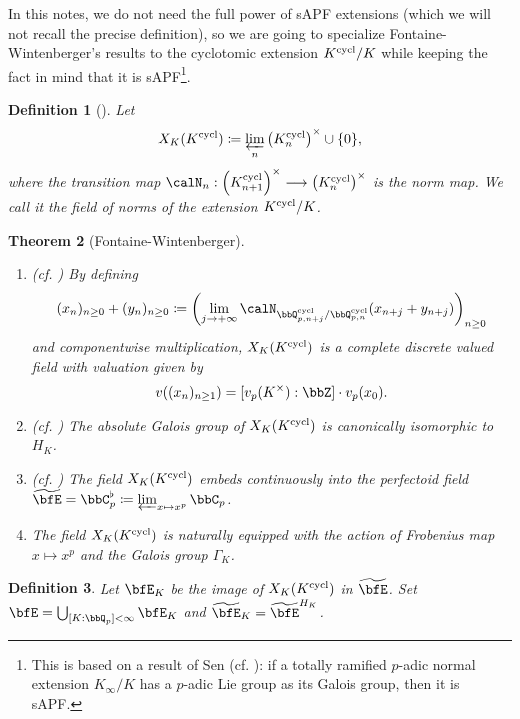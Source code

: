\documentclass[a4paper,oneside]{amsart}
\newtheorem{theorem}{Theorem}[section]
\newtheorem{definition}[theorem]{Definition}
\numberwithin{equation}{section}
\numberwithin{figure}{section}
\begin{document}
In this notes, we do not need the full power of sAPF extensions (which we will not recall the precise definition), so we are going to specialize Fontaine-Wintenberger's results to the cyclotomic extension $K^{\operatorname{cycl}}/K$ while keeping the fact in mind that it is sAPF\footnote{This is based on a result of Sen (cf. \cite{sen_ramification_1972}): if a totally ramified $p$-adic normal extension $K_\infty/K$ has a $p$-adic Lie group as its Galois group, then it is sAPF.}.
\begin{definition}[{\cite[Section 2.1.1]{wintenberger_corps_1983}}]
    Let $$X_K(K^{\operatorname{cycl}})\coloneqq\varprojlim_n \left(K_n^{\operatorname{cycl}}\right)^\times\cup\{0\},$$
    where the transition map $\calN_n:\left(K_{n+1}^{\opn{cycl}}\right)^\times\lto \left(K_n^{\opn{cycl}}\right)^\times$ is the norm map. We call it the field of norms of the extension $K^{\operatorname{cycl}}/K$.
\end{definition}
\begin{theorem}[Fontaine-Wintenberger]\leavevmode
    \begin{enumerate}
        \item (cf. \cite[Th\'eor\`eme 2.1.3]{wintenberger_corps_1983}) By defining 
        $$(x_n)_{n\geq 0}+(y_n)_{n\geq 0}\coloneqq \left(\lim_{j\to +\infty}\calN_{\bbQ_{p,n+j}^{\opn{cycl}}/\bbQ_{p,n}^{\opn{cycl}}}(x_{n+j}+y_{n+j})\right)_{n\geq 0}$$
        and componentwise multiplication, $X_K(K^{\operatorname{cycl}})$ is a complete discrete valued field with valuation given by
              $$v((x_n)_{n\geq 1})=[v_p(K^\times):\bbZ]\cdot v_p(x_0).$$
        \item (cf. \cite[Corollaire 3.2.3]{wintenberger_corps_1983}) The absolute Galois group of $X_K(K^{\operatorname{cycl}})$ is canonically isomorphic to $H_K$.
        \item (cf. \cite[Proposition 4.2.1]{wintenberger_corps_1983}) The field $X_K(K^{\operatorname{cycl}})$ embeds continuously into the perfectoid field $\widetilde{\bfE}=\bbC_p^\flat\coloneqq \varprojlim_{x\mapsto x^p}\bbC_p$.
        \item The field $X_K(K^{\operatorname{cycl}})$ is naturally equipped with the action of Frobenius map $x\mapsto x^p$ and the Galois group $\Gamma_K$.
    \end{enumerate}
\end{theorem}
\begin{definition}
    Let $\bfE_K$ be the image of $X_K(K^{\operatorname{cycl}})$ in $\widetilde{\bfE}$. Set $\bfE=\bigcup_{[K:\bbQ_p]<\infty}\bfE_K$ and $\widetilde{\bfE}_K=\widetilde{\bfE}^{H_K}$.
\end{definition}
\end{document}
